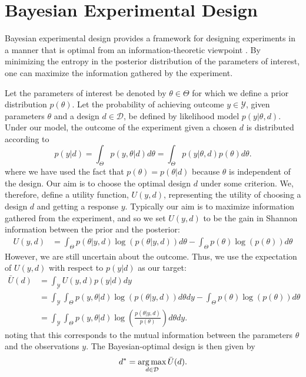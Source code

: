 
\section{Bayesian Experimental Design}
\label{sec:exp-design}

Bayesian experimental design provides a framework for designing experiments in a manner that is optimal from
an information-theoretic viewpoint \citep{chaloner1995bayesian,sebastiani2000maximum}.  By minimizing the entropy in the posterior distribution of the 
parameters of interest, one can maximize the information gathered by the experiment.

Let the parameters of interest be denoted by $\theta \in \Theta$ for which we define a prior distribution $p(\theta)$.
Let the probability of achieving outcome $y\in\mathcal{Y}$, given parameters $\theta$ 
and a design $d \in \mathcal{D}$, be defined by likelihood model $p(y | \theta, d)$.
Under our model, the outcome of the experiment given a chosen $d$ is distributed according to
\begin{equation}
\label{eq:marginal_def}
p(y | d) = \int_{\Theta} p(y,\theta | d) d\theta = \int_{\Theta} p(y | \theta, d) p(\theta) d\theta.
\end{equation}
where we have used the fact that $p(\theta)=p(\theta|d)$ because $\theta$ is independent of the design.
Our aim is to choose the optimal design $d$ under some criterion. 
We, therefore, define a utility function, $U(y,d)$, representing the utility of choosing a design $d$ 
and getting a response $y$.
Typically our aim is to maximize information gathered from the experiment, and so we set 
$U(y,d)$ to be the gain in Shannon information between the prior and the posterior:
\begin{align}
\label{eq:shannon_inf}
U(y,d) &= \int_{\Theta} p(\theta |y, d) \log(p(\theta |y, d)) d\theta -\int_{\Theta} p(\theta) \log(p(\theta))d\theta
\end{align}
However, we are still uncertain about the outcome. Thus, we use the expectation of $U(y,d)$ with respect to $p(y | d)$
as our target:
\begin{align}
\bar{U}(d) & = \int_{\mathcal{Y}} U(y,d) p(y|d) dy\nonumber\\
&=\int_{\mathcal{Y}}\int_{\Theta} p(y,\theta | d)\log(p(\theta |y, d)) d\theta dy - \int_{\Theta} p(\theta) \log(p(\theta)) d\theta \nonumber\\
&=\int_{\mathcal{Y}}\int_{\Theta} p(y,\theta | d)\log\left(\frac{p(\theta |y, d)}{p(\theta)}\right)d\theta dy. 
\label{eq:u_bar_1}
\end{align}
noting that this corresponds to the mutual information between the parameters $\theta$ and
the observations $y$.  The Bayesian-optimal design is then given by
\begin{equation}
\label{eq:d_star}
d^* = \operatorname*{arg\,max}_{d \in \mathcal{D}} \bar{U}(d).
\end{equation}

